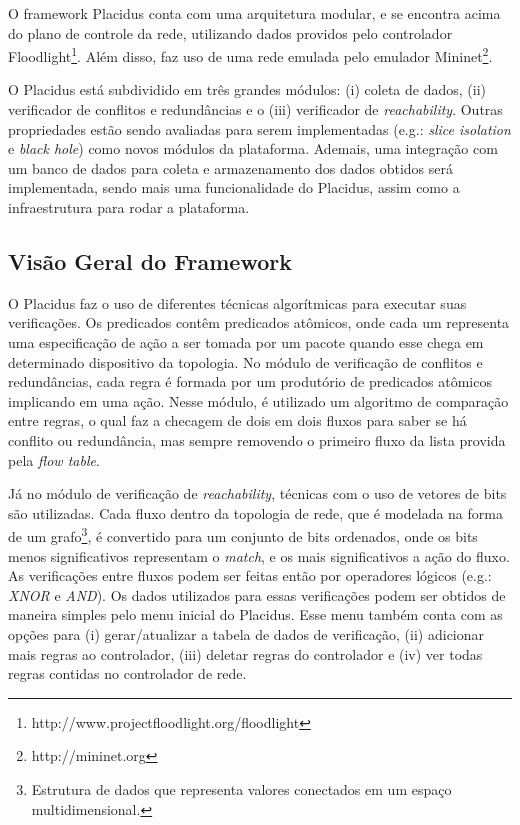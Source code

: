 \documentclass[12pt]{article}
\begin{document}
O framework Placidus conta com uma arquitetura modular, e se encontra acima do plano de controle da rede, utilizando dados providos pelo controlador Floodlight\footnote{http://www.projectfloodlight.org/floodlight}.
Além disso, faz uso de uma rede emulada pelo emulador Mininet\footnote{http://mininet.org}.

O Placidus está subdividido em três grandes módulos: (i) coleta de dados, (ii) verificador de conflitos e redundâncias e o (iii) verificador de \textit{reachability}. Outras propriedades estão sendo avaliadas para serem implementadas (e.g.: \textit{slice isolation} e \textit{black hole}) como novos módulos da plataforma.
Ademais, uma integração com um banco de dados para coleta e armazenamento dos dados obtidos será implementada, sendo mais uma funcionalidade do Placidus, assim como a infraestrutura para rodar a plataforma.

\subsection{Visão Geral do Framework}

O Placidus faz o uso de diferentes técnicas algorítmicas para executar suas verificações.
Os predicados contêm predicados atômicos, onde cada um representa uma especificação de ação a ser tomada por um pacote quando esse chega em determinado dispositivo da topologia.
No módulo de verificação de conflitos e redundâncias, cada regra é formada por um produtório de predicados atômicos implicando em uma ação.
Nesse módulo, é utilizado um algoritmo de comparação entre regras, o qual faz a checagem de dois em dois fluxos para saber se há conflito ou redundância, mas sempre removendo o primeiro fluxo da lista provida pela \textit{flow table}.

Já no módulo de verificação de \textit{reachability}, técnicas com o uso de vetores de bits são utilizadas. Cada fluxo dentro da topologia de rede, que é modelada na forma de um grafo\footnote{Estrutura de dados que representa valores conectados em um espaço multidimensional.}, é convertido para um conjunto de bits ordenados, onde os bits menos significativos representam o \textit{match}, e os mais significativos a ação do fluxo.
As verificações entre fluxos podem ser feitas então por operadores lógicos (e.g.: \textit{XNOR} e \textit{AND}).
Os dados utilizados para essas verificações podem ser obtidos de maneira simples pelo menu inicial do Placidus. Esse menu também conta com as opções para (i) gerar/atualizar a tabela de dados de verificação, (ii) adicionar mais regras ao controlador, (iii) deletar regras do controlador e (iv) ver todas regras contidas no controlador de rede.
\end{document}
